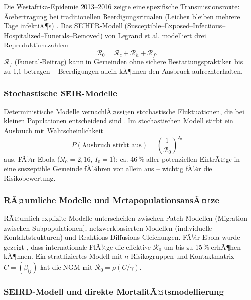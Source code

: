 ﻿\documentclass[12pt,a4paper]{article}
\theoremstyle{definition}
\theoremstyle{plain}
\theoremstyle{remark}
\begin{document}
Die Westafrika-Epidemie 2013--2016 zeigte eine spezifische Transmissionsroute:
Ãœbertragung bei traditionellen Beerdigungsritualen (Leichen bleiben mehrere Tage
infektiÃ¶s) \cite{faye2015}. Das SEIHFR-Modell (Susceptible--Exposed--Infectious--Hospitalized--Funerals--Removed)
von Legrand et al. \cite{legrand2007} modelliert drei Reproduktionszahlen:
\[
  \mathcal{R}_0 = \mathcal{R}_c + \mathcal{R}_h + \mathcal{R}_f.
\]
$\mathcal{R}_f$ (Funeral-Beitrag) kann in Gemeinden ohne sichere Bestattungspraktiken
bis zu 1,0 betragen -- Beerdigungen allein kÃ¶nnen den Ausbruch aufrechterhalten.

\subsubsection{Stochastische SEIR-Modelle}

Deterministische Modelle vernachlÃ¤ssigen stochastische Fluktuationen, die bei
kleinen Populationen entscheidend sind \cite{allen2017}. Im stochastischen Modell
stirbt ein Ausbruch mit Wahrscheinlichkeit
\[
  P(\text{Ausbruch stirbt aus}) = \left(\frac{1}{\mathcal{R}_0}\right)^{I_0}
\]
aus. FÃ¼r Ebola ($\mathcal{R}_0 = 2{,}16$, $I_0 = 1$): ca. 46\,\% aller potenziellen
EintrÃ¤ge in eine suszeptible Gemeinde fÃ¼hren von allein aus -- wichtig fÃ¼r die Risikobewertung.

\subsubsection{RÃ¤umliche Modelle und MetapopulationsansÃ¤tze}

RÃ¤umlich explizite Modelle unterscheiden zwischen Patch-Modellen (Migration zwischen
Subpopulationen), netzwerkbasierten Modellen (individuelle Kontaktstrukturen) und
Reaktions-Diffusions-Gleichungen. FÃ¼r Ebola wurde gezeigt \cite{gomes2014}, dass
internationale FlÃ¼ge die effektive $\mathcal{R}_0$ um bis zu 15\,\% erhÃ¶hen kÃ¶nnen.
Ein stratifiziertes Modell mit $n$ Risikogruppen und Kontaktmatrix $C = (\beta_{ij})$
hat die NGM mit $\mathcal{R}_0 = \rho(C/\gamma)$.

\subsubsection{SEIRD-Modell und direkte MortalitÃ¤tsmodellierung}
\end{document}
